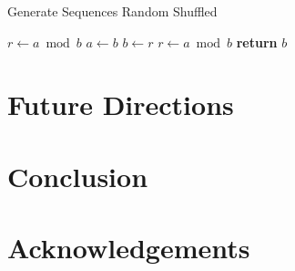 \documentclass[11pt, a4paper]{report}
\begin{document}
% 
% 


\begin{algorithm}
  \caption{Generate Sequences Random Shuffled}
  \begin{algorithmic}[1]
      \State $r\gets a\bmod b$
        \State $a\gets b$
        \State $b\gets r$
        \State $r\gets a\bmod b$
      \EndWhile
      \State \textbf{return} $b$
    \EndProcedure

  \end{algorithmic}
\end{algorithm}



\section{Future Directions}
\label{sec:future}


\section{Conclusion}
\label{sec:conclusion}

\section{Acknowledgements} 
\label{sec:acknowledgements}


   
\end{document}
